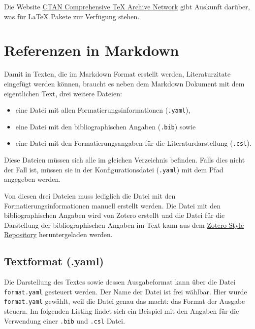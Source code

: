 \documentclass[
  nswissgerman,
  a4paper,
  DIV=11,
  numbers=noendperiod,
  ngerman]{scrreprt}
\providecommand{\tightlist}{%
  \setlength{\itemsep}{0pt}\setlength{\parskip}{0pt}}
\begin{document}
Die Website \href{https://ctan.org/}{CTAN Comprehensive TeX Archive
Network} gibt Auskunft darüber, was für LaTeX Pakete zur Verfügung
stehen.

\chapter{Referenzen in Markdown}\label{referenzen-in-markdown}

Damit in Texten, die im Markdown Format erstellt werden, Literaturzitate
eingefügt werden können, braucht es neben dem Markdown Dokument mit dem
eigentlichen Text, drei weitere Dateien:

\begin{itemize}
\tightlist
\item
  eine Datei mit allen Formatierungsinformationen (\texttt{.yaml}),
\item
  eine Datei mit den bibliographischen Angaben (\texttt{.bib}) sowie
\item
  eine Datei mit den Formatierungsangaben für die Literaturdarstellung
  (\texttt{.csl}).
\end{itemize}

Diese Dateien müssen sich alle im gleichen Verzeichnis befinden. Falls
dies nicht der Fall ist, müssen sie in der Konfigurationsdatei
(\texttt{.yaml}) mit dem Pfad angegeben werden.

Von diesen drei Dateien muss lediglich die Datei mit den
Formatierungsinformationen manuell erstellt werden. Die Datei mit den
bibliographischen Angaben wird von Zotero erstellt und die Datei für die
Darstellung der bibliographischen Angaben im Text kann aus dem
\href{https://www.zotero.org/styles}{Zotero Style Repository}
heruntergeladen werden.

\section{Textformat (.yaml)}\label{textformat-.yaml}

Die Darstellung des Textes sowie dessen Ausgabeformat kann über die
Datei \texttt{format.yaml} gesteuert werden. Der Name der Datei ist frei
wählbar. Hier wurde \texttt{format.yaml} gewählt, weil die Datei genau
das macht: das Format der Ausgabe steuern. Im folgenden Listing findet
sich ein Beispiel mit den Angaben für die Verwendung einer \texttt{.bib}
und \texttt{.csl} Datei.
\end{document}
